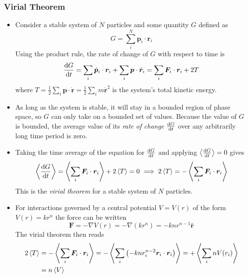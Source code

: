 \documentclass[11pt, a4paper]{article}
\newcommand{\uvec}[1]{\hat{\mathbf{#1}}}
\newcommand{\bdot}[1]{\dot{\bm{#1}}}
\renewcommand{\grad}{\nabla }
\begin{document}
\subsubsection{Virial Theorem}
\begin{itemize}
	\item Consider a stable system of $ N $ particles and some quantity $ G $ defined as
	\begin{equation*}
		G = \sum_{i}^{N} \bm{p}_{i} \cdot \bm{r}_{i}
	\end{equation*}
	Using the product rule, the rate of change of $ G $ with respect to time is
	\begin{equation*}
		\dv{G}{t} = \sum_{i} \bdot{p}_{i} \cdot \bm{r}_{i} + \sum_{i} \bm{p} \cdot \bdot{r}_{i} = \sum_{i} \bm{F}_{i} \cdot \bm{r}_{i} + 2 T
	\end{equation*}
	where $ T = \frac{1}{2}\sum_{i}\bm{p}\cdot \bdot{r} = \frac{1}{2} \sum_{i} m \bdot{r}^{2} $ is the system's total kinetic energy.
	
	\item As long as the system is stable, it will stay in a bounded region of phase space, so $ G $ can only take on a bounded set of values. Because the value of $ G $ is bounded, the average value of its \textit{rate of change} $ \dv{G}{t} $ over any arbitrarily long time period is zero.
	
	\item Taking the time average of the equation for $ \dv{G}{t} $ and applying $ \expval{\dv{G}{t}} = 0 $ gives
	\begin{equation*}
		\expval{\dv{G}{t}} = \expval{\sum_{i} \bm{F}_{i} \cdot \bm{r}_{i}} + 2 \expval{T} = 0 \implies 2 \expval{T}  = -\expval{\sum_{i} \bm{F}_{i} \cdot \bm{r}_{i}}
	\end{equation*}
	This is the \textit{virial theorem} for a stable system of $ N $ particles. 
	
	\item For interactions governed by a central potential $ V = V(r) $ of the form $ V(r) = k r^{n}$ the force can be written
	\begin{equation*}
		\bm{F} = -\grad{V}(r) = -\grad(kr^{n}) = - k n r^{n-1} \uvec{r}
	\end{equation*}
	The virial theorem then reads
	\begin{align*}
		2\expval{T} &= -\expval{\sum_{i} \bm{F}_{i} \cdot \bm{r}_{i}} =  -\expval{\sum_{i} \left(-k n r_{i}^{n-2}\bm{r}_{i}\cdot \bm{r}_{i}\right) } = + \expval{\sum_{i} nV(r_{i})}\\
		&=n\expval{V}
	\end{align*}
		
\end{itemize}
\end{document}
